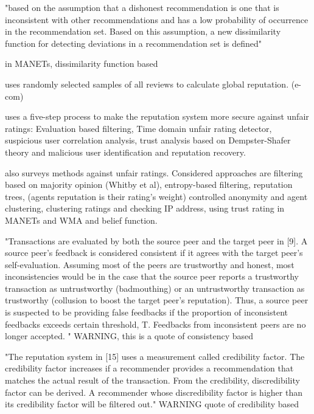 \documentclass[%
    ]{\PathToTumTemplate/thesis/tum_thesis}
\begin{document}
\cite{iltaf_mechanism_2013}
"based on the assumption that a dishonest recommendation is one that is inconsistent with other recommendations and has a low probability of occurrence in the recommendation set. Based on this assumption, a new dissimilarity function for detecting deviations in a recommendation set is defined"

\cite{zakirullah_detection_2014} in MANETs, dissimilarity function based

\cite{rezvani_randomized_2020} uses randomly selected samples of all reviews to calculate global reputation. (e-com)

\cite{baby_secure_2014} uses a five-step process to make the reputation system more secure against unfair ratings:
Evaluation based filtering, 
Time domain unfair rating detector, 
suspicious user correlation analysis, 
trust analysis based on Dempster-Shafer theory and 
malicious user identification and reputation recovery.

\cite{ngo_survey_2007} also surveys methods against unfair ratings. Considered approaches are
filtering based on majority opinion (Whitby et al), 
entropy-based filtering, 
reputation trees, (agents reputation is their rating's weight)
controlled anonymity and agent clustering,
clustering ratings and checking IP address, 
using trust rating in MANETs and 
WMA and belief function.

\cite{azzedin_identifying_2010}

"Transactions are evaluated by both the source peer and the target peer in [9]. A source peer's feedback is considered
consistent if it agrees with the target peer's self-evaluation. Assuming most of the peers are trustworthy and honest,
most inconsistencies would be in the case that the source peer reports a trustworthy transaction as untrustworthy
(badmouthing) or an untrustworthy transaction as trustworthy (collusion to boost the target peer's reputation). Thus,
a source peer is suspected to be providing false feedbacks if the proportion of inconsistent feedbacks exceeds certain
threshold, T. Feedbacks from inconsistent peers are no longer accepted.
" WARNING, this is a quote of consistency based

"The reputation system in [15] uses a measurement called credibility factor. The credibility factor increases if a
recommender provides a recommendation that matches the actual result of the transaction. From the credibility,
discredibility factor can be derived. A recommender whose discredibility factor is higher than its credibility factor
will be filtered out."
WARNING quote of credibility based
\end{document}
